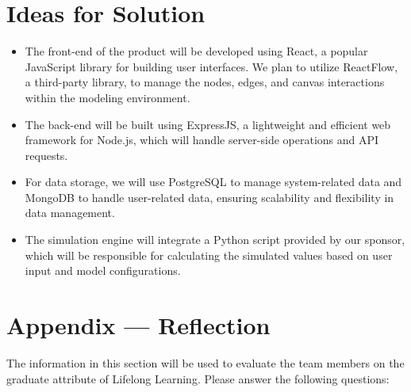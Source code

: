 \documentclass[12pt]{article}
\begin{document}
\section{Ideas for Solution}
\begin{itemize}
  \item The front-end of the product will be developed using React, a popular JavaScript library for building user interfaces. We plan to utilize ReactFlow, a third-party library, to manage the nodes, edges, and canvas interactions within the modeling environment.
  
  \item The back-end will be built using ExpressJS, a lightweight and efficient web framework for Node.js, which will handle server-side operations and API requests.
  
  \item For data storage, we will use PostgreSQL to manage system-related data and MongoDB to handle user-related data, ensuring scalability and flexibility in data management.
  
  \item The simulation engine will integrate a Python script provided by our sponsor, which will be responsible for calculating the simulated values based on user input and model configurations.
\end{itemize}


\newpage{}
\section*{Appendix --- Reflection}

The information in this section will be used to evaluate the team members on the
graduate attribute of Lifelong Learning.  Please answer the following questions:
\end{document}
